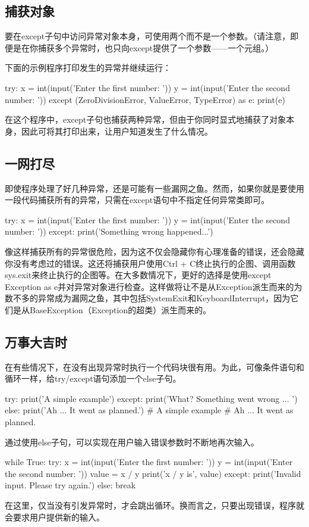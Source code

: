 \subsection{捕获对象}
要在except子句中访问异常对象本身，可使用两个而不是一个参数。（请注意，即便是在你捕获多个异常时，也只向except提供了一个参数——一个元组。）

下面的示例程序打印发生的异常并继续运行：
\begin{pyc}
try:
    x = int(input('Enter the first number: '))
    y = int(input('Enter the second number: '))
except (ZeroDivisionError, ValueError, TypeError) as e:
    print(e)
\end{pyc}
在这个程序中，except子句也捕获两种异常，但由于你同时显式地捕获了对象本身，因此可将其打印出来，让用户知道发生了什么情况。
\subsection{一网打尽}
即使程序处理了好几种异常，还是可能有一些漏网之鱼。然而，如果你就是要使用一段代码捕获所有的异常，只需在except语句中不指定任何异常类即可。

\begin{pyc}
try:
    x = int(input('Enter the first number: '))
    y = int(input('Enter the second number: '))
except:
    print('Something wrong happened...')
\end{pyc}

像这样捕获所有的异常很危险，因为这不仅会隐藏你有心理准备的错误，还会隐藏你没有考虑过的错误。这还将捕获用户使用Ctrl + C终止执行的企图、调用函数sys.exit来终止执行的企图等。在大多数情况下，更好的选择是使用except Exception as e并对异常对象进行检查。这样做将让不是从Exception派生而来的为数不多的异常成为漏网之鱼，其中包括SystemExit和KeyboardInterrupt，因为它们是从BaseException（Exception的超类）派生而来的。

\subsection{万事大吉时}
在有些情况下，在没有出现异常时执行一个代码块很有用。为此，可像条件语句和循环一样，给try/except语句添加一个else子句。
\begin{pyc}
try:
    print('A simple example')
except:
    print('What? Something went wrong ... ')
else:
    print('Ah ... It went as planned.')
# A simple example
# Ah ... It went as planned.
\end{pyc}
通过使用else子句，可以实现在用户输入错误参数时不断地再次输入。
\begin{pyc}
while True:
    try:
        x = int(input('Enter the first number: '))
        y = int(input('Enter the second number: '))
        value = x / y
        print('x / y is', value)
    except:
        print('Invalid input. Please try again.')
    else:
        break
\end{pyc}
在这里，仅当没有引发异常时，才会跳出循环。换而言之，只要出现错误，程序就会要求用户提供新的输入。

